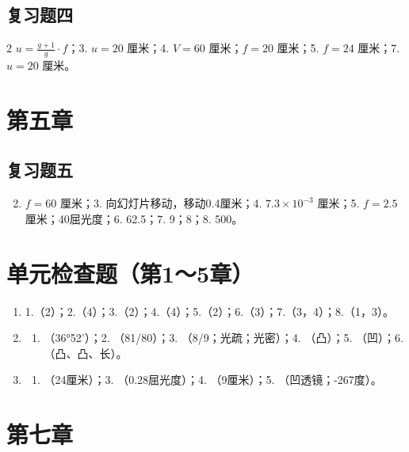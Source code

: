 \subsection{复习题四}

2 \(u = \frac{g + 1}{g} \cdot f\)；3. \(u = 20\) 厘米；4. \(V = 60\)
厘米；\(f = 20\) 厘米；5. \(f = 24\) 厘米；7. \(u = 20\) 厘米。

\section{第五章}

\subsection{复习题五}

\begin{enumerate}
\setcounter{enumi}{1}
\item
  \(f = 60\) 厘米；3. 向幻灯片移动，移动0.4厘米；4.
  \(7.3 \times 10^{-3}\) 厘米；5. \(f = 2.5\) 厘米；40屈光度；6.
  62.5；7. 9；8；8. 500。
\end{enumerate}

\section{单元检查题（第1～5章）}

\begin{enumerate}
\item
  1.（2）；2.（4）；3.（2）；4.（4）；5.（2）；6.（3）；7.（3，4）；8.（1，3）。
\end{enumerate}

\begin{enumerate}[label=\Roman*.]
\setcounter{enumi}{1}
\item
  \begin{enumerate}
  \item
    （36°52'）；2. （81/80）；3. （8/9；光疏；光密）；4. （凸）；5.
    （凹）；6. （凸、凸、长）。
  \end{enumerate}
\item
  \begin{enumerate}
  \item
    （24厘米）；3. （0.28屈光度）；4. （9厘米）；5. （凹透镜；-267度）。
  \end{enumerate}
\end{enumerate}

\section{第七章}

